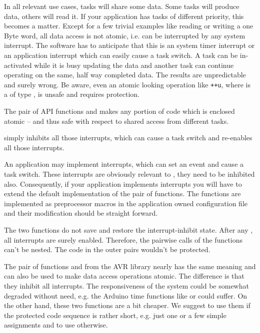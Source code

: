 In all relevant use cases, tasks will share some data. Some tasks will
produce data, others will read it. If your application has tasks of
different priority, this becomes a matter. Except for a few trivial
examples like reading or writing a one Byte word, all data access is not
atomic, i.e. can be interrupted by any system interrupt. The software has
to anticipate that this is an \rtos{} system timer interrupt or an
application interrupt which can easily cause a task switch. A task can be
in-activated while it is busy updating the data and another task can
continue operating on the same, half way completed data. The results are
unpredictable and surely wrong. Be aware, even an atomic looking operation
like \verb$++u$, where  is a of type , is unsafe
and requires protection.

The pair of API functions  and
 makes any portion of code which is
enclosed atomic -- and thus safe with respect to shared access from
different tasks.

 simply inhibits all those interrupts,
which can cause a task switch and 
re-enables all those interrupts.

An application may implement interrupts, which can set an \rtos{} event
and cause a task switch. These interrupts are obviously relevant to
, they need to be inhibited also.
Consequently, if your application implements interrupts you will have to
extend the default implementation of the pair of functions. The functions
are implemented as preprocessor macros in the application owned \rtos{}
configuration file  and their modification should be
straight forward.

The two functions do not save and restore the interrupt-inhibit state.
After any , all interrupts are
surely enabled. Therefore, the pairwise calls of the functions can't be
nested. The code in the outer pairs wouldn't be protected.

The pair of functions  and  from the AVR library
nearly has the same meaning and can also be used to make data access
operations atomic. The difference is that they inhibit all interrupts. The
responsiveness of the system could be somewhat degraded without need, e.g.
the Arduino time functions like  or  could
suffer. On the other hand, these two functions are a bit cheaper. We
suggest to use them if the protected code sequence is rather short, e.g.
just one or a few simple assignments and to use
 otherwise.

